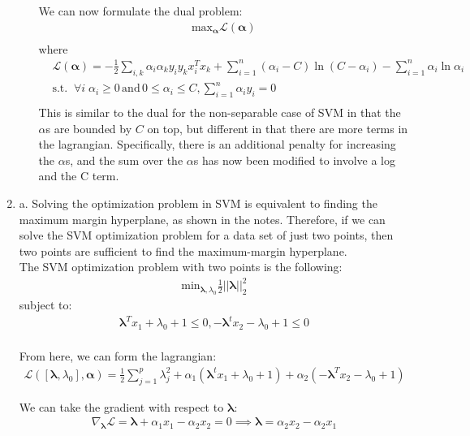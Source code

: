 \documentclass[11pt]{article}
\newcommand{\A}{\bm{\alpha}}
\begin{document}
\begin{enumerate}
\begin{itemize}
We can now formulate the dual problem:
\begin{align*}
\text{max}_{\bm{\alpha}} \mathcal{L}(\A)\\
\end{align*}
where
\begin{align*}
&\mathcal{L}(\A) = -\frac{1}{2}\sum_{i,k}\alpha_i\alpha_ky_iy_kx_i^Tx_k +  \sum_{i=1}^n(\alpha_i - C) \ln (C - \alpha_i) - \sum_{i=1}^n\alpha_i \ln \alpha_i\\
&\text{s.t.} \; \; \forall i \; \alpha_i \geq 0 \, \text{and} \,  0 \leq \alpha_i \leq C, \sum_{i=1}^n \alpha_iy_i = 0\\
\end{align*}
This is similar to the dual for the non-separable case of SVM in that the $\alpha$s are bounded by $C$ on top, but different in that there are more terms in the lagrangian. Specifically, there is an additional penalty for increasing the $\alpha$s, and the sum over the $\alpha$s has now been modified to involve a log and the C term.
\end{itemize}





\item a. Solving the optimization problem in SVM is equivalent to finding the maximum margin hyperplane, as shown in the notes. Therefore, if we can solve the SVM optimization problem for a data set of just two points, then two points are sufficient to find the maximum-margin hyperplane.\\

The SVM optimization problem with two points is the following:
\begin{align*}
\text{min}_{\bm{\lambda}, \lambda_0} \frac{1}{2} ||\bm{\lambda}||_2^2
\end{align*}
subject to:
\begin{align*}
\bm{\lambda}^Tx_1 + \lambda_0 + 1 \leq 0, - \bm{\lambda}^tx_2 - \lambda_0 + 1 \leq 0\\
\end{align*}

From here, we can form the lagrangian:
\begin{align*}
\mathcal{L}([\bm{\lambda},\lambda_0],\bm{\alpha}) = \frac{1}{2} \sum_{j=1}^p\lambda_j^2 + \alpha_1(\bm{\lambda}^tx_1 + \lambda_0 + 1) + \alpha_2(-\bm{\lambda}^Tx_2 - \lambda_0 + 1)
\end{align*}

We can take the gradient with respect to $\bm{\lambda}$:
\begin{align*}
\nabla_{\bm{\lambda}} \mathcal{L} = \bm{\lambda} + \alpha_1x_1 - \alpha_2x_2 =0 \implies \bm{\lambda} = \alpha_2x_2 - \alpha_2x_1
\end{align*}



\end{enumerate}
\end{document}
